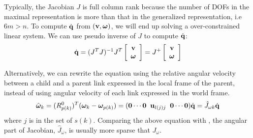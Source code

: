 Typically, the Jacobian $J$ is full column rank because the
number of DOFs in the maximal representation is more than that in the
generalized representation, i.e $6m > n$. To compute $\dot{\mathbf{q}}$ from $(\mathbf{v}, \bm{\omega})$, we
will end up solving a over-constrained linear system. We can use
pseudo inverse of $J$ to compute $\dot{\mathbf{q}}$:
\begin{equation}
 \dot{\mathbf{q}} = (J^TJ)^{-1}J^T
\left[
\begin{array}{c}
\mathbf{v} \\
\bm{\omega}
\end{array}
\right]
 = J^+
\left[
\begin{array}{c}
\mathbf{v} \\
\bm{\omega}
\end{array}
\right]
\end{equation}

Alternatively, we can rewrite the equation using the relative angular
velocity between a child and a parent link expressed in the local
frame of the parent, instead of using angular velocity of each link
expressed in the world frame.
\begin{equation}
\hat{\bm{\omega}}_k = (R^0_{p(k)})^T(\bm{\omega}_k - \bm{\omega}_{p(k)}) = (\mathbf{0} \cdots \mathbf{0} \;\; \mathbf{u}_{l(j)j} \;\; \mathbf{0}
\cdots \mathbf{0}) \dot{\mathbf{q}} = \hat{J}_{\omega k} \dot{\mathbf{q}} 
\end{equation}
where $j$ is in the set of $s(k)$. Comparing the above equation with ,
the angular part of Jacobian, $\hat{J}_\omega$, is usually more sparse
that $J_\omega$.


